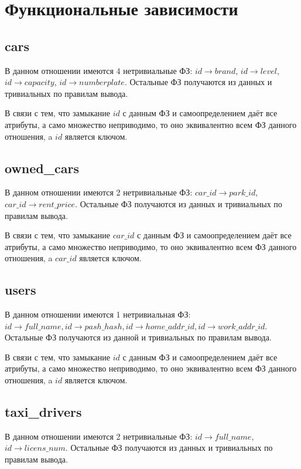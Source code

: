 \documentclass[fontsize=12pt]{article}
\begin{document}
\section{Функциональные зависимости}

\subsection{cars}

В данном отношении имеются 4 нетривиальные ФЗ: $id \rightarrow brand$, $id \rightarrow level$, $id \rightarrow capacity$, $id \rightarrow numberplate$. Остальные ФЗ получаются из данных и тривиальных по правилам вывода. 

В связи с тем, что замыкание $id$ с данным ФЗ и самоопределением даёт все атрибуты, а само множество неприводимо, то оно эквивалентно всем ФЗ данного отношения, a $id$ является ключом.

\subsection{owned\_cars}

В данном отношении имеются 2 нетривиальные ФЗ: $car\_id \rightarrow park\_id$, $car\_id \rightarrow rent\_price$. Остальные ФЗ получаются из данных и тривиальных по правилам вывода. 

В связи с тем, что замыкание $car\_id$ с данным ФЗ и самоопределением даёт все атрибуты, а само множество неприводимо, то оно эквивалентно всем ФЗ данного отношения, a $car\_id$ является ключом.

\subsection{users}

В данном отношении имеются 1 нетривиальная ФЗ: $id \rightarrow full\_name, id \rightarrow pash\_hash, id \rightarrow home\_addr\_id, id \rightarrow work\_addr\_id$. Остальные ФЗ получаются из данной и тривиальных по правилам вывода. 

В связи с тем, что замыкание $id$ с данным ФЗ и самоопределением даёт все атрибуты, а само множество неприводимо, то оно эквивалентно всем ФЗ данного отношения, a $id$ является ключом.

\subsection{taxi\_drivers}

В данном отношении имеются 2 нетривиальные ФЗ: $id \rightarrow full\_name$, $id \rightarrow licens\_num$. Остальные ФЗ получаются из данных и тривиальных по правилам вывода. 
\end{document}
